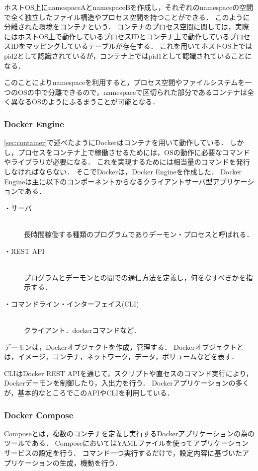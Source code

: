 ホストOS上にnamespaceAとnamespaceBを作成し，それぞれのnamespaceの空間で全く独立したファイル構造やプロセス空間を持つことができる．
このように分離された環境をコンテナという．
コンテナのプロセス空間に関しては，実際にはホストOS上で動作しているプロセスIDとコンテナ上で動作しているプロセスIDをマッピングしているテーブルが存在する．
これを用いてホストOS上ではpid2として認識されているが，コンテナ上ではpid1として認識されていることになる．

このことによりnamespaceを利用すると，プロセス空間やファイルシステムを一つのOSの中で分離できるので，namespaceで区切られた部分であるコンテナは全く異なるOSのようにふるまうことが可能となる．

\subsubsection{Docker Engine}
\ref{sec:container}で述べたようにDockerはコンテナを用いて動作している．
しかし，プロセスをコンテナ上で稼働させるためには，OSの動作に必要なコマンドやライブラリが必要になる．
これを実現するためには相当量のコマンドを発行しなければならない．
そこでDockerは，Docker Engineを作成した．
Docker Engineは主に以下のコンポーネントからなるクライアントサーバ型アプリケーションである．

\begin{description}
    \item[・サーバ]\mbox{}\\
        長時間稼働する種類のプログラムでありデーモン・プロセスと呼ばれる．
    \item[・REST API]\mbox{}\\
        プログラムとデーモンとの間での通信方法を定義し，何をなすべきかを指示する．
    \item[・コマンドライン・インターフェイス(CLI)]\mbox{}\\
        クライアント．dockerコマンドなど．
\end{description}

デーモンは，Dockerオブジェクトを作成，管理する．
Dockerオブジェクトとは，イメージ，コンテナ，ネットワーク，データ，ボリュームなどを表す．

CLIはDocker REST APIを通じて，スクリプトや直セスのコマンド実行により，Dockerデーモンを制御したり，入出力を行う．
Dockerアプリケーションの多くが，基本的なところでこのAPIやCLIを利用している．

\subsubsection{Docker Compose}
Composeとは，複数のコンテナを定義し実行するDockerアプリケーションの為のツールである．
ComposeにおいてはYAMLファイルを使ってアプリケーションサービスの設定を行う．
コマンド一つ実行するだけで，設定内容に基づいたアプリケーションの生成，機動を行う．

